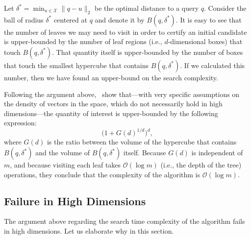 Let $\delta^\ast = \min_{u \in \mathcal{X}} \lVert q - u \rVert_2$ be the optimal distance to a query $q$.
Consider the ball of radius $\delta^\ast$ centered at $q$ and denote it by $B(q, \delta^\ast)$.
It is easy to see that the number of leaves we may need to visit in order to certify
an initial candidate is upper-bounded by the number of leaf regions (i.e., $d$-dimensional boxes)
that touch $B(q, \delta^\ast)$. That quantity itself is upper-bounded by the number of boxes
that touch the smallest hypercube that contains $B(q, \delta^\ast)$. If we calculated this
number, then we have found an upper-bound on the search complexity.

Following the argument above,~\cite{freidman1977kdtree_proof} show that---with
very specific assumptions on the density of vectors in the space, which do not
necessarily hold in high dimensions---the quantity of interest is upper-bounded
by the following expression:
\begin{equation}
    \label{equation:branch-and-bound:kdtree:original_upperbound}
    \big( 1 + G(d)^{1/d} \big)^d,
\end{equation}
where $G(d)$ is the ratio between the volume of the hypercube that contains $B(q, \delta^\ast)$
and the volume of $B(q, \delta^\ast)$ itself. Because $G(d)$ is independent of $m$,
and because visiting each leaf takes $\mathcal{O}(\log m)$ (i.e., the depth of the tree)
operations, they conclude that the complexity of the algorithm is $\mathcal{O}(\log m)$.

\subsection{Failure in High Dimensions}
The argument above regarding the search time complexity of the algorithm
fails in high dimensions. Let us elaborate why in this section.

